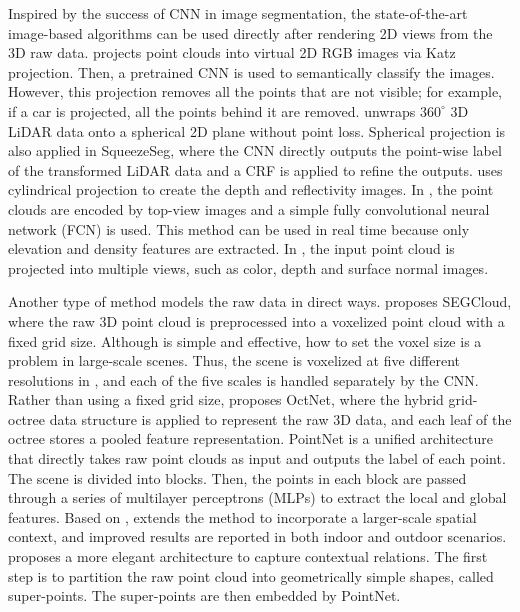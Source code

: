 	Inspired by the success of CNN in image segmentation, the state-of-the-art image-based algorithms can be used directly after rendering 2D views from the 3D raw data. \cite{tosteberg2017semantic} projects point clouds into virtual 2D RGB images via Katz projection. Then, a pretrained CNN is used to semantically classify the images. However, this projection removes all the points that are not visible; for example, if a car is projected, all the points behind it are removed. \cite{dewan17iros} unwraps $360^\circ$ 3D LiDAR data onto a spherical 2D plane without point loss. Spherical projection is also applied in SqueezeSeg\cite{wu2017squeezeseg}, where the CNN directly outputs the point-wise label of the transformed LiDAR data and a CRF is applied to refine the outputs. \cite{piewak2018boosting} uses cylindrical projection to create the depth and reflectivity images. In \cite{caltagirone2017fast}, the point clouds are encoded by top-view images and a simple fully convolutional neural network (FCN) is used. This method can be used in real time because only elevation and density features are extracted. In \cite{lawin2017deep}, the input point cloud is projected into multiple views, such as color, depth and surface normal images. 
	
	Another type of method models the raw data in direct ways. \cite{tchapmi2017segcloud} proposes SEGCloud, where the raw 3D point cloud is preprocessed into a voxelized point cloud with a fixed grid size. Although \cite{tchapmi2017segcloud} is simple and effective, how to set the voxel size is a problem in large-scale scenes. Thus, the scene is voxelized at five different resolutions in \cite{hackel2017isprs}, and each of the five scales is handled separately by the CNN. Rather than using a fixed grid size, \cite{riegler2017octnet} proposes OctNet, where the hybrid grid-octree data structure is applied to represent the raw 3D data, and each leaf of the octree stores a pooled feature representation. PointNet\cite{qi2017pointnet} is a unified architecture that directly takes raw point clouds as input and outputs the label of each point. The scene is divided into blocks. Then, the points in each block are passed through a series of multilayer perceptrons (MLPs) to extract the local and global features. Based on \cite{qi2017pointnet}, \cite{engelmann2017exploring} extends the method to incorporate a larger-scale spatial context, and improved results are reported in both indoor and outdoor scenarios. \cite{landrieu2017large} proposes a more elegant architecture to capture contextual relations. The first step is to partition the raw point cloud into geometrically simple shapes, called super-points. The super-points are then embedded by PointNet\cite{qi2017pointnet}.
	
